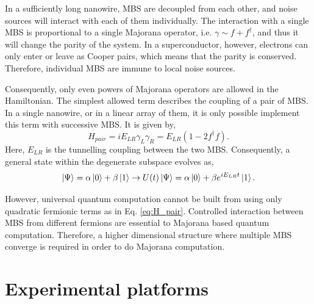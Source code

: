In a sufficiently long nanowire, MBS are decoupled from each other, and noise sources will interact with each of them individually.
The interaction with a single MBS is proportional to a single Majorana operator, i.e. $\gamma \sim f + f^{\dagger}$, and thus it will change the parity of the system.
In a superconductor, however, electrons can only enter or leave as Cooper pairs, which means that the parity is conserved. 
Therefore, individual MBS are immune to local noise sources.

Consequently, only even powers of Majorana operators are allowed in the Hamiltonian.
The simplest allowed term describes the coupling of a pair of MBS.
In a single nanowire, or in a linear array of them, it is only possible implement this term with successive MBS.
It is given by,
\begin{equation}\label{eq:H_pair}
H_{pair} = i E_{LR} \gamma_{L} \gamma_{R} = E_{LR} (1 - 2 f^{\dagger} f).
\end{equation}
Here, $E_{LR}$ is the tunnelling coupling between the two MBS.
Consequently, a general state within the degenerate subspace evolves as,
\begin{equation}
\ket{\Psi}  = \alpha \ket 0 +\beta \ket 1 \rightarrow U(t) \ket{\Psi} = \alpha \ket 0 + \beta e^{i E_{LR} t} \ket 1.
\end{equation}

However, universal quantum computation cannot be built from using only quadratic fermionic terms as in Eq. \ref{eq:H_pair}.
Controlled interaction between MBS from different fermions are essential to Majorana based quantum computation.
Therefore, a higher dimensional structure where multiple MBS converge is required in order to do Majorana computation.

\section{Experimental platforms}

